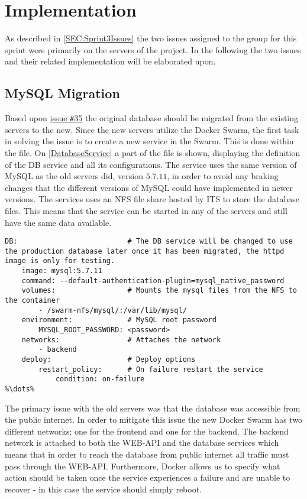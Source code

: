 \section{Implementation} \label{SEC:Sprint3Implementation}
As described in \autoref{SEC:Sprint3Issues} the two issues assigned to the group for this sprint were primarily on the servers of the project.
In the following the two issues and their related implementation will be elaborated upon.

\subsection{MySQL Migration}
Based upon \href{https://github.com/aau-giraf/wiki/issues/35}{issue \texttt{\#}35} the original database should be migrated from the existing servers to the new.
Since the new servers utilize the Docker Swarm, the first task in solving the issue is to create a new service in the Swarm.
This is done within the  file.
On \autoref{DatabaseService} a part of the file is shown, displaying the definition of the DB service and all its configurations.
The service uses the same version of MySQL as the old servers did, version $5.7.11$, in order to avoid any braking changes that the different versions of MySQL could have implemented in newer versions.
The services uses an NFS file share hosted by ITS to store the database files.
This means that the service can be started in any of the servers and still have the same data available.

\begin{lstlisting}[caption={Docker database service},captionpos=b,label=DatabaseService,escapechar=\%]
%\dots%
DB:                          # The DB service will be changed to use the production database later once it has been migrated, the httpd image is only for testing.
    image: mysql:5.7.11
    command: --default-authentication-plugin=mysql_native_password
    volumes:                 # Mounts the mysql files from the NFS to the container
        - /swarm-nfs/mysql/:/var/lib/mysql/
    environment:             # MySQL root password
        MYSQL_ROOT_PASSWORD: <password>
    networks:                # Attaches the network
        - backend
    deploy:                  # Deploy options
        restart_policy:      # On failure restart the service
            condition: on-failure
%\dots%
\end{lstlisting}

The primary issue with the old servers was that the database was accessible from the public internet.
In order to mitigate this issue the new Docker Swarm has two different networks; one for the frontend and one for the backend.
The backend network is attached to both the WEB-API and the database services which means that in order to reach the database from public internet all traffic must pass through the WEB-API.
Furthermore, Docker allows us to specify what action should be taken once the service experiences a failure and are unable to recover - in this case the service should simply reboot.

